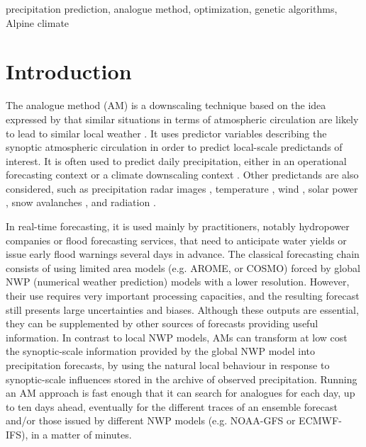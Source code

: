 \documentclass[review]{elsarticle}
\begin{document}
\begin{frontmatter}
\begin{keyword}
	precipitation prediction\sep
	analogue method\sep
	optimization\sep
	genetic algorithms\sep
	Alpine climate
\end{keyword}
	
\end{frontmatter}

\linenumbers

\section{Introduction}
\label{sec:intro}

The analogue method (AM) is a downscaling technique based on the idea expressed by \citet{Lorenz1956, Lorenz1969} that similar situations in terms of atmospheric circulation are likely to lead to similar local weather \citep{Duband1970}. It uses predictor variables describing the synoptic atmospheric circulation in order to predict local-scale predictands of interest. It is often used to predict daily precipitation, either in an operational forecasting context \citep[e.g.][]{Guilbaud1997, Bontron2005, Hamill2006, Bliefernicht2010, Marty2012, Horton2012, Horton2016a, Hamill2015, BenDaoud2016} or a climate downscaling context \citep[e.g.][]{Radanovics2013, Chardon2014, Dayon2015, Raynaud2016b}. Other predictands are also considered, such as precipitation radar images \citep{Panziera2011,Foresti2015a}, temperature \citep{Radinovic1975, Woodcock1980, Kruizinga1983, DelleMonache2013, Caillouet2016, Raynaud2016b}, wind \citep{Gordon1987, DelleMonache2013, DelleMonache2011, Vanvyve2015, Alessandrini2015, Junk2015, Junk2015c}, solar power \citep{Alessandrini2015a, Bessa2015}, snow avalanches \citep{Obled1980, Bolognesi1993}, and radiation \citep{Bois1981, Raynaud2016b}.

In real-time forecasting, it is used mainly by practitioners, notably hydropower companies or flood forecasting services, that need to anticipate water yields or issue early flood warnings several days in advance. The classical forecasting chain consists of using limited area models (e.g. AROME, or COSMO) forced by global NWP (numerical weather prediction) models with a lower resolution. However, their use requires very important processing capacities, and the resulting forecast still presents large uncertainties and biases. Although these outputs are essential, they can be supplemented by other sources of forecasts providing useful information. In contrast to local NWP models, AMs can transform at low cost the synoptic-scale information provided by the global NWP model into precipitation forecasts, by using the natural local behaviour in response to synoptic-scale influences stored in the archive of observed precipitation. Running an AM approach is fast enough that it can search for analogues for each day, up to ten days ahead, eventually for the different traces of an ensemble forecast and/or those issued by different NWP models (e.g. NOAA-GFS or ECMWF-IFS), in a matter of minutes.
\end{document}
